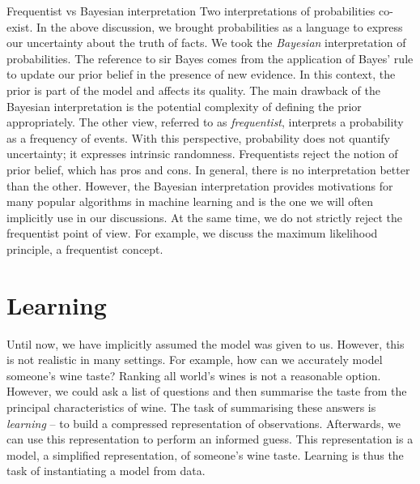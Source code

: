 \begin{side_note}{Frequentist vs Bayesian interpretation}
  Two interpretations of probabilities co-exist. In the above discussion, we brought probabilities as a language to express our uncertainty about the truth of facts. We took the \textit{Bayesian} interpretation of probabilities. The reference to sir Bayes comes from the application of Bayes' rule to update our prior belief in the presence of new evidence. In this context, the prior is part of the model and affects its quality. The main drawback of the Bayesian interpretation is the potential complexity of defining the prior appropriately. The other view, referred to as \textit{frequentist}, interprets a probability as a frequency of events. With this perspective, probability does not quantify uncertainty; it expresses intrinsic randomness. Frequentists reject the notion of prior belief, which has pros and cons. In general, there is no interpretation better than the other. However, the Bayesian interpretation provides motivations for many popular algorithms in machine learning and is the one we will often implicitly use in our discussions. At the same time, we do not strictly reject the frequentist point of view. For example, we discuss the maximum likelihood principle, a frequentist concept.
\end{side_note}
%

\section{Learning}
Until now, we have implicitly assumed the model was given to us. However, this is not realistic in many settings. For example, how can we accurately model someone's wine taste? Ranking all world's wines is not a reasonable option. However, we could ask a list of questions and then summarise the taste from the principal characteristics of wine. The task of summarising these answers is \textit{learning} -- to build a compressed representation of observations. Afterwards, we can use this representation to perform an informed guess. This representation is a model, a simplified representation, of someone's wine taste. Learning is thus the task of instantiating a model from data.

